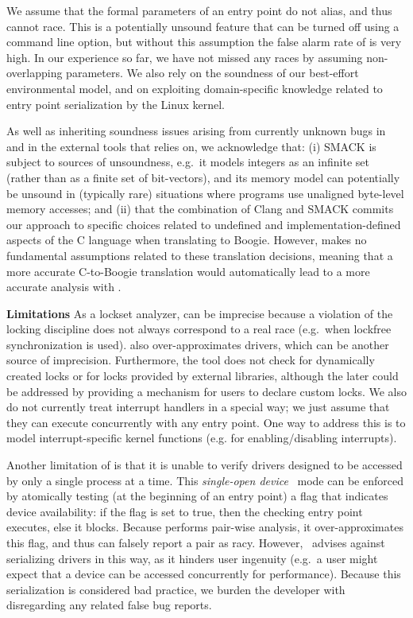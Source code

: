 We assume that the formal parameters of an entry point do not alias, and thus cannot race. This is a potentially unsound feature that can be turned off using a command line option, but without this assumption the false alarm rate of \whoop is very high. In our experience so far, we have not missed any races by assuming non-overlapping parameters.  We also rely on the soundness of our best-effort environmental model, and on exploiting domain-specific knowledge related to entry point serialization by the Linux kernel.

As well as inheriting soundness issues arising from currently unknown bugs in \whoop and in the external tools that \whoop relies on, we acknowledge that: (i) SMACK is subject to sources of unsoundness, e.g.\ it models integers as an infinite set (rather than as a finite set of bit-vectors), and its memory model can potentially be unsound in (typically rare) situations where programs use unaligned byte-level memory accesses; and (ii) that the combination of Clang and SMACK commits our approach to specific choices related to undefined and implementation-defined aspects of the C language when translating to Boogie.  However, \whoop makes no fundamental assumptions related to these translation decisions, meaning that a more accurate C-to-Boogie translation would automatically lead to a more accurate analysis with \whoop.

\noindent\textbf{Limitations }
%
As a lockset analyzer, \whoop can be imprecise because a violation of the locking discipline does not always correspond to a real race (e.g.\ when lockfree synchronization is used). \whoop also over-approximates drivers, which can be another source of imprecision. Furthermore, the tool does not check for dynamically created locks or for locks provided by external libraries, although the later could be addressed by providing a mechanism for users to declare custom locks. We also do not currently treat interrupt handlers in a special way; we just assume that they can execute concurrently with any entry point. One way to address this is to model interrupt-specific kernel functions (e.g. for enabling/disabling interrupts).

Another limitation of \whoop is that it is unable to verify drivers designed to be accessed by only a single process at a time. This \emph{single-open device}~\cite{corbet2005linux} mode can be enforced by atomically testing (at the beginning of an entry point) a flag that indicates device availability: if the flag is set to true, then the checking entry point executes, else it blocks. Because \whoop performs pair-wise analysis, it over-approximates this flag, and thus can falsely report a pair as racy. However,~\cite{corbet2005linux} advises against serializing drivers in this way, as it hinders user ingenuity (e.g.\ a user might expect that a device can be accessed concurrently for performance). Because this serialization is considered bad practice, we burden the developer with disregarding any related false bug reports.


